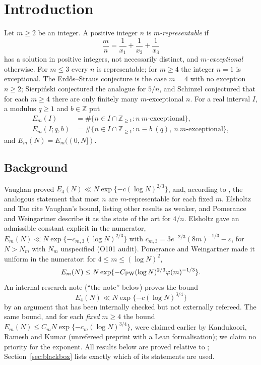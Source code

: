 \documentclass[10pt,reqno]{amsart}
\theoremstyle{definition}
\newcommand{\Z}{\mathbb Z}
\begin{document}
\section{Introduction}\label{sec:intro}
Let $m\geq2$ be an integer.  A positive integer $n$ is
\emph{$m$-representable} if
\begin{equation}\label{eq:mn}
 \frac mn=\frac1{x_1}+\frac1{x_2}+\frac1{x_3}
\end{equation}
has a solution in positive integers, not necessarily distinct, and
\emph{$m$-exceptional} otherwise.
For $m\leq3$ every $n$ is representable; for $m\geq4$ the integer $n=1$
is exceptional.  The Erd\H{o}s--Straus conjecture is the case $m=4$ with
no exception $n\geq2$; Sierpi\'nski conjectured the analogue for $5/n$, and
Schinzel conjectured that for each $m\geq4$ there are only finitely many
$m$-exceptional $n$.  For a real interval $I$, a modulus $q\geq1$ and
$b\in\Z$ put
\[
 \begin{aligned}
 E_m(I)&=\#\{n\in I\cap\Z_{\geq1}:n\ m\text{-exceptional}\},\\
 E_m(I;q,b)&=\#\{n\in I\cap\Z_{\geq1}:n\equiv b\ (q),\ n\ m\text{-exceptional}\},
 \end{aligned}
\]
and $E_m(N)=E_m((0,N])$.

\subsection*{Background}
Vaughan \cite{Vaughan} proved $E_4(N)\ll N\exp\{-c(\log N)^{2/3}\}$, and,
according to \cite[abstract]{PW}, the analogous statement that most $n$
are $m$-representable for each fixed $m$.  Elsholtz and Tao
\cite[\S1]{ET} cite Vaughan's bound, listing other results as weaker,
and Pomerance and Weingartner \cite[p.~2]{PW} describe it as the state of
the art for $4/n$.
Elsholtz \cite[Rem.~7.3]{Els} gave an admissible constant explicit in
the numerator, $E_m(N)\ll N\exp\{-c_{m,3}(\log N)^{2/3}\}$ with
$c_{m,3}=3e^{-2/3}(8m)^{-1/3}-\varepsilon$, for $N>N_m$ with $N_m$
unspecified (O101 audit).
Pomerance and Weingartner \cite[Thm.~1.3]{PW} made it uniform in the
numerator: for $4\leq m\leq(\log N)^2$,
\begin{equation}\label{eq:PW}
 E_m(N)\leq N\exp\{-C_{\rm PW}(\log N)^{2/3}\varphi(m)^{-1/3}\}.
\end{equation}
An internal research note \cite{TQ} (``the note'' below) proves the
bound
\[
 E_4(N)\ll N\exp\{-c(\log N)^{3/4}\}
\]
by an argument that has been internally checked but not externally
refereed.  The same bound, and for each \emph{fixed} $m\geq4$ the bound
$E_m(N)\leq C_mN\exp\{-c_m(\log N)^{3/4}\}$, were claimed earlier by
Kandukoori, Ramesh and Kumar \cite[Thms.~1--2]{KRK} (unrefereed preprint
with a Lean formalisation); we claim no priority for the exponent.
All results below are
proved relative to \cite{TQ}; Section~\ref{sec:blackbox} lists exactly
which of its statements are used.
\end{document}

